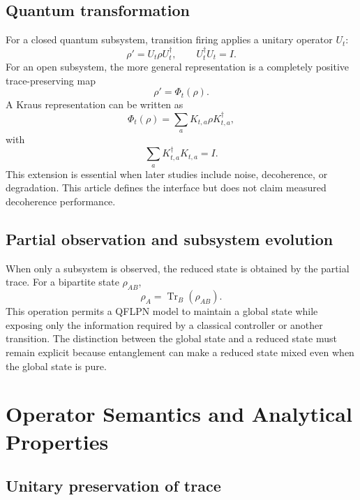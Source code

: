 \documentclass[final,3p,times]{elsarticle}
\begin{document}
\subsection{Quantum transformation}

For a closed quantum subsystem, transition firing applies a unitary operator $U_t$:
\begin{equation}
    \rho' = U_t\rho U_t^\dagger,
    \qquad
    U_t^\dagger U_t=I.
\end{equation}
For an open subsystem, the more general representation is a completely positive trace-preserving map
\begin{equation}
    \rho'=\Phi_t(\rho).
\end{equation}
A Kraus representation can be written as
\begin{equation}
    \Phi_t(\rho)=\sum_a K_{t,a}\rho K_{t,a}^\dagger,
\end{equation}
with
\begin{equation}
    \sum_a K_{t,a}^\dagger K_{t,a}=I.
\end{equation}
This extension is essential when later studies include noise, decoherence, or degradation. This article defines the interface but does not claim measured decoherence performance.

\subsection{Partial observation and subsystem evolution}

When only a subsystem is observed, the reduced state is obtained by the partial trace. For a bipartite state $\rho_{AB}$,
\begin{equation}
    \rho_A=\operatorname{Tr}_B(\rho_{AB}).
\end{equation}
This operation permits a QFLPN model to maintain a global state while exposing only the information required by a classical controller or another transition. The distinction between the global state and a reduced state must remain explicit because entanglement can make a reduced state mixed even when the global state is pure.

\section{Operator Semantics and Analytical Properties}

\subsection{Unitary preservation of trace}
\end{document}
